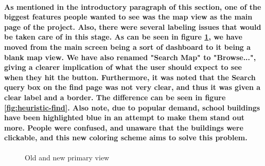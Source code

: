 \documentclass{report}
\begin{document}
    \paragraph{As mentioned in the introductory paragraph of this section, one
    of the biggest features people wanted to see was the map view as the main page
    of the project. Also, there were several labeling issues that would be taken
    care of in this stage. As can be seen in figure \ref{fig:heuristic-primary}, we have moved from the
    main screen being a sort of dashboard to it being a blank map view. We have also
    renamed "Search Map" to "Browse...", giving a clearer implication of what the
    user should expect to see when they hit the button. Furthermore, it was noted
    that the Search query box on the find page was not very clear, and thus it was
    given a clear label and a border. The difference can be seen in figure
    \ref{fig:heuristic-find}.
    Also note, due to popular demand, school buildings have been highlighted blue in
    an attempt to make them stand out more. People were confused, and unaware that
    the buildings were clickable, and this new coloring scheme aims to solve this
    problem.}
    \begin{figure}
    \centering
    \caption{Old and new primary view}
    \label{fig:heuristic-primary}
    \end{figure}
\end{document}
